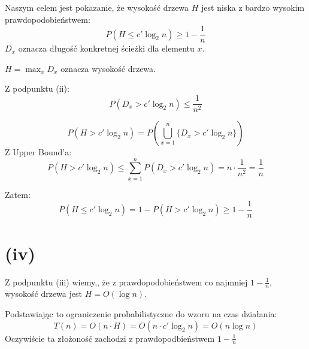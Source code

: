 Naszym celem jest pokazanie, że wysokość drzewa \(H\) jest niska z bardzo wysokim prawdopodobieństwem:
\[P(H \le c' \log_2 n) \ge 1 - \frac{1}{n}\]
\(D_x\) oznacza długość konkretnej ścieżki dla elementu \(x\).

\(H = \max_{x} D_x\) oznacza wysokość drzewa.

Z podpunktu (ii):
\[P(D_x > c' \log_2 n) \le \frac{1}{n^2}\]


\[P(H > c' \log_2 n) = P\left(\bigcup_{x=1}^n \{D_x > c' \log_2 n\}\right)\]
Z Upper Bound'a:
\[P(H > c' \log_2 n) \le \sum_{x=1}^n P(D_x > c' \log_2 n) = n \cdot \frac{1}{n^2}  = \frac{1}{n}\]



Zatem:
\[P(H \le c' \log_2 n) = 1 - P(H > c' \log_2 n) \ge 1 - \frac{1}{n}\]

\section*{(iv)}
Z podpunktu (iii) wiemy,, że z prawdopodobieństwem co najmniej \(1 - \frac{1}{n}\), wysokość drzewa jest \(H = O(\log n)\).


Podstawiając to ograniczenie probabilistyczne do wzoru na czas działania:
\[T(n) = O(n \cdot H) = O(n \cdot c' \log_2 n)  = O(n \log n)\]
Oczywiście ta złożoność zachodzi z prawdopodbieństwem \(1 - \frac{1}{n}\)

